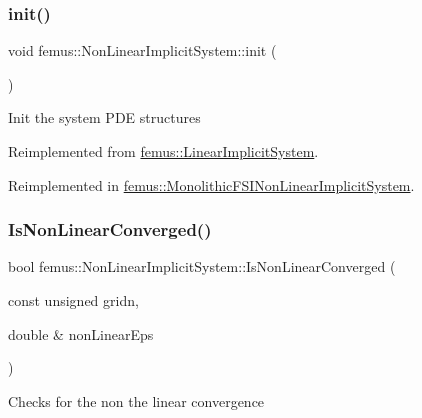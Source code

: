 \subsubsection{\texorpdfstring{init()}{init()}}
{\footnotesize\ttfamily void femus\+::\+Non\+Linear\+Implicit\+System\+::init (\begin{DoxyParamCaption}{ }\end{DoxyParamCaption})\hspace{0.3cm}{\ttfamily [virtual]}}

Init the system P\+DE structures 

Reimplemented from \mbox{\hyperlink{classfemus_1_1_linear_implicit_system_a4605bac9ea670bb7dbd4454358155670}{femus\+::\+Linear\+Implicit\+System}}.



Reimplemented in \mbox{\hyperlink{classfemus_1_1_monolithic_f_s_i_non_linear_implicit_system_a07e04a8cce138cae9edcdd05fd1c7829}{femus\+::\+Monolithic\+F\+S\+I\+Non\+Linear\+Implicit\+System}}.

\mbox{\label{classfemus_1_1_non_linear_implicit_system_a1bd16b7e0fafb9b06ea7d529fd0b0f7b}} 
\subsubsection{\texorpdfstring{Is\+Non\+Linear\+Converged()}{IsNonLinearConverged()}}
{\footnotesize\ttfamily bool femus\+::\+Non\+Linear\+Implicit\+System\+::\+Is\+Non\+Linear\+Converged (\begin{DoxyParamCaption}\item[{const unsigned}]{gridn,  }\item[{double \&}]{non\+Linear\+Eps }\end{DoxyParamCaption})}

Checks for the non the linear convergence \mbox{\label{classfemus_1_1_non_linear_implicit_system_a660090dc6ccd56ed4f04758168099669}} 
